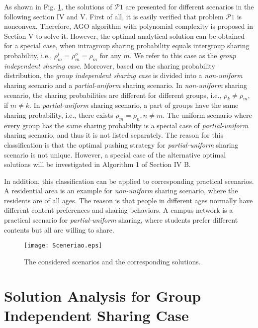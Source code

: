 \documentclass[12pt, draftclsnofoot, onecolumn]{IEEEtran}
\begin{document}
As shown in Fig. \ref{figSS}, the solutions of  $\mathcal{P}1$ are presented for different scenarios in the following section IV and V.
First of all, it is easily verified that problem $ \mathcal{P}1$ is nonconvex.
Therefore, AGO algorithm with polynomial complexity is proposed in Section V to solve it.
However, the optimal analytical solution can be obtained for a special case, when intragroup sharing probability equals intergroup sharing probability, i.e., $\rho_m^i=\rho_m^o=\rho_m$ for any $m$.
We refer to this case as the \textit{group independent sharing case}.
Moreover, based on the sharing probability distribution, the \textit{group independent sharing case} is divided into a \textit{non-uniform} sharing scenario and a \textit{partial-uniform} sharing scenario.
In \textit{non-uniform} sharing scenario, the sharing probabilities are different for different groups, i.e., $\rho_k \neq \rho_m$, if $m \neq k$.
In \textit{partial-uniform} sharing scenario, a part of groups have the same sharing probability, i.e., there exists $\rho_{m}= \rho_{n}, n \neq m$.
The uniform scenario where every group has the same sharing probability is a special case of \textit{partial-uniform} sharing scenario, and thus it is not listed separately.
The reason for this classification is that the optimal pushing strategy for \textit{partial-uniform} sharing scenario is not unique.
However, a special case of the alternative optimal solutions will be investigated in Algorithm 1 of Section IV B.

In addition, this classification can be applied to corresponding practical scenarios.
A residential area is an example for \textit{non-uniform} sharing scenario, where the residents are of all ages.
The reason is that people in different ages normally have different content preferences and sharing behaviors.
A campus network is a practical scenario for \textit{partial-uniform} sharing, where students prefer different contents but all are willing to share.

\begin{figure}
\centering
\texttt{[image: Sceneriao.eps]}
\caption{The considered scenarios and the corresponding solutions.}
\label{figSS}
\end{figure}


\section{Solution Analysis for Group Independent Sharing Case}
\end{document}
